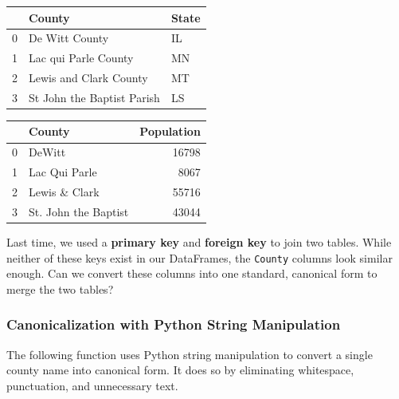 \documentclass[
  letterpaper,
  DIV=11,
  numbers=noendperiod]{scrreprt}
\begin{document}
\begin{tabular}{lll}
\toprule
{} &                      County & State \\
\midrule
0 &              De Witt County &    IL \\
1 &        Lac qui Parle County &    MN \\
2 &      Lewis and Clark County &    MT \\
3 &  St John the Baptist Parish &    LS \\
\bottomrule
\end{tabular}

\begin{tabular}{llr}
\toprule
{} &                County &  Population \\
\midrule
0 &                DeWitt &       16798 \\
1 &         Lac Qui Parle &        8067 \\
2 &         Lewis \& Clark &       55716 \\
3 &  St. John the Baptist &       43044 \\
\bottomrule
\end{tabular}

Last time, we used a \textbf{primary key} and \textbf{foreign key} to
join two tables. While neither of these keys exist in our DataFrames,
the \texttt{County} columns look similar enough. Can we convert these
columns into one standard, canonical form to merge the two tables?

\hypertarget{canonicalization-with-python-string-manipulation}{%
\subsubsection{Canonicalization with Python String
Manipulation}\label{canonicalization-with-python-string-manipulation}}

The following function uses Python string manipulation to convert a
single county name into canonical form. It does so by eliminating
whitespace, punctuation, and unnecessary text.
\end{document}
